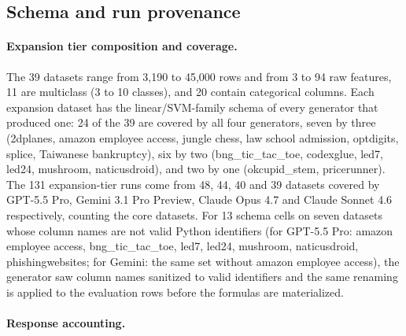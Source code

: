 \subsection*{Schema and run provenance}

\paragraph{Expansion tier composition and coverage.}

The 39 datasets range from 3,190 to 45,000 rows and from 3 to 94 raw features, 11 are multiclass (3 to 10 classes), and 20 contain categorical columns. Each expansion dataset has the linear/SVM-family schema of every generator that produced one: 24 of the 39 are covered by all four generators, seven by three (2dplanes, amazon employee access, jungle chess, law school admission, optdigits, splice, Taiwanese bankruptcy), six by two (bng\_tic\_tac\_toe, codexglue, led7, led24, mushroom, naticusdroid), and two by one (okcupid\_stem, pricerunner). The 131 expansion-tier runs come from 48, 44, 40 and 39 datasets covered by GPT-5.5 Pro, Gemini 3.1 Pro Preview, Claude Opus 4.7 and Claude Sonnet 4.6 respectively, counting the core datasets. For 13 schema cells on seven datasets whose column names are not valid Python identifiers (for GPT-5.5 Pro: amazon employee access, bng\_tic\_tac\_toe, led7, led24, mushroom, naticusdroid, phishingwebsites; for Gemini: the same set without amazon employee access), the generator saw column names sanitized to valid identifiers and the same renaming is applied to the evaluation rows before the formulas are materialized.

\paragraph{Response accounting.}

